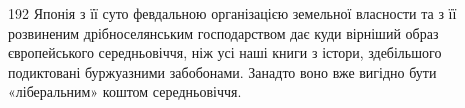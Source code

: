 192    Японія з її суто февдальною організацією земельної власности
та з її розвиненим дрібноселянським господарством дає куди вірніший
образ європейського середньовіччя, ніж усі наші книги з істори, здебільшого
подиктовані буржуазними забобонами. Занадто воно вже вигідно
бути «ліберальним» коштом середньовіччя.
